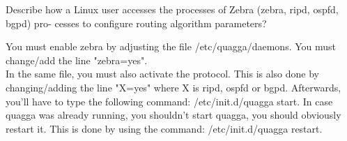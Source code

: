 Describe how a Linux user accesses the processes of Zebra (zebra, ripd, ospfd, bgpd) pro-
cesses to configure routing algorithm parameters?

You must enable zebra by adjusting the file /etc/quagga/daemons. You must change/add the line "zebra=yes". \\
In the same file, you must also activate the protocol. This is also done by changing/adding the line "X=yes" where X is ripd, ospfd or bgpd.
Afterwards, you'll have to type the following command: /etc/init.d/quagga start.
In case quagga was already running, you shouldn't start quagga, you should obviously restart it. This is done by using the command: /etc/init.d/quagga restart.